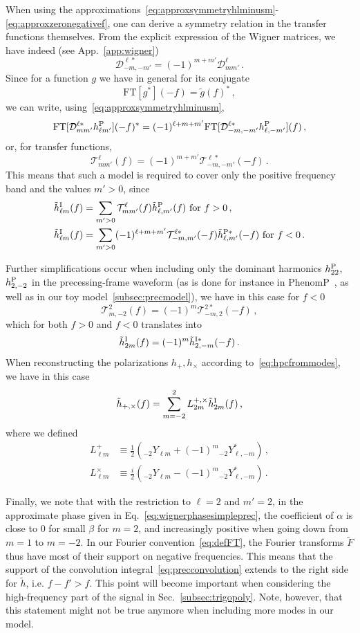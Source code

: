 \documentclass[aps,showpacs,twocolumn,
prd,superscriptaddress,nofootinbib]{revtex4-1}
\newcommand{\be}{\begin{equation}}
\newcommand{\ee}{\end{equation}}
\newcommand\calT{{\mathcal{T}}}
\newcommand\calD{{\mathcal{D}}}
\newcommand{\nn}{\nonumber}
\begin{document}
When using the approximations~\eqref{eq:approxsymmetryhlminusm}-\eqref{eq:approxzeronegativef}, one can derive a symmetry relation in the transfer functions themselves. From the explicit expression of the Wigner matrices, we have indeed (see App.~\ref{app:wigner})
\be
	\calD^{\ell *}_{-m,-m'} = (-1)^{m+m'}\calD^{\ell}_{mm'} \,.
\ee
Since for a function $g$ we have in general for its conjugate
\be
	\mathrm{FT}[g^{*}](-f) = \tilde{g}(f)^{*} \,,
\ee
we can write, using~\eqref{eq:approxsymmetryhlminusm},
\be
	\mathrm{FT}[\calD^{\ell *}_{mm'} h_{\ell m'}^{\rm P}](-f)^{*} = (-1)^{\ell+m+m'} \mathrm{FT}[\calD^{\ell *}_{-m,-m'} h_{\ell, -m'}^{\rm P}](f) \,,
\ee
or, for transfer functions,
\be
	\calT^{\ell}_{mm'}(f) = (-1)^{m+m'} \calT^{\ell *}_{-m,-m'}(-f) \,.
\ee
This means that such a model is required to cover only the positive frequency band and the values $m'>0$, since
\begin{align}\label{eq:hIlmposnegfreq}
	\tilde{h}^{\rm I}_{\ell m}(f) &= \sum_{m'>0} \calT^{\ell}_{mm'}(f) \tilde{h}^{\rm P}_{\ell, m'}(f) \text{ for } f>0 \,, \nn\\
	\tilde{h}^{\rm I}_{\ell m}(f) &= \sum_{m'>0} (-1)^{\ell+m+m'} \calT^{\ell *}_{-m,m'}(-f) \tilde{h}^{\rm P *}_{\ell, m'}(-f) \text{ for } f<0 \,.
\end{align}

Further simplifications occur when including only the dominant harmonics $h^{\rm P}_{22}$, $h^{\rm P}_{2,-2}$ in the precessing-frame waveform (as is done for instance in PhenomP~\cite{Hannam+13}, as well as in our toy model~\ref{subsec:precmodel}), we have in this case for $f<0$
\be
	\calT^{2}_{m,-2}(f) = (-1)^{m} \calT^{2 *}_{-m,2}(-f) \,,
\ee
which for both $f>0$ and $f<0$ translates into
\be\label{eq:symmetryhIfor22only}
	\tilde{h}^{\rm I}_{2 m}(f) = (-1)^{m} \tilde{h}^{\rm I *}_{2,-m}(-f) \,.
\ee
When reconstructing the polarizations $h_{+},h_{\times}$ according to~\eqref{eq:hpcfrommodes}, we have in this case
\be
	\tilde{h}_{+,\times} (f) = \sum_{m = -2}^{2} L^{+,\times}_{2 m} \tilde{h}^{\rm I}_{2 m}(f) \,,
\ee
where we defined
\begin{align}
	L^{+}_{\ell m} &\equiv \frac{1}{2} \left( {}_{-2}Y_{\ell m} + (-1)^{m} {}_{-2}Y_{\ell, -m}^{*} \right) \,, \nn\\
	L^{\times}_{\ell m} &\equiv \frac{i}{2} \left( {}_{-2}Y_{\ell m} - (-1)^{m} {}_{-2}Y_{\ell, -m}^{*} \right) \,.
\end{align}

Finally, we note that with the restriction to $\ell = 2$ and $m' = 2$, in the approximate phase given in Eq.~\eqref{eq:wignerphasesimpleprec}, the coefficient of $\alpha$ is close to $0$ for small $\beta$ for $m=2$, and increasingly positive when going down from $m=1$ to $m=-2$. In our Fourier convention~\eqref{eq:defFT}, the Fourier transforms $\tilde{F}$ thus have most of their support on negative frequencies. This means that the support of the convolution integral~\eqref{eq:precconvolution} extends to the right side for $\tilde{h}$, i.e. $f-f' > f$. This point will become important when considering the high-frequency part of the signal in Sec.~\ref{subsec:trigopoly}. Note, however, that this statement might not be true anymore when including more modes in our model.
\end{document}
